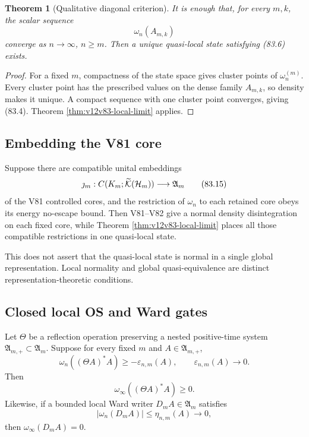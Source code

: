 \documentclass[11pt]{article}
\newtheorem{theorem}{Theorem}[section]
\theoremstyle{remark}
\begin{document}
\begin{theorem}[Qualitative diagonal criterion]
\label{thm:v12v83-qualitative}
It is enough that, for every \(m,k\), the scalar sequence
\begin{equation}
                              \omega_n(A_{m,k})               \tag{83.14}
\end{equation}
converge as \(n\to\infty\), \(n\geq m\).  Then a unique
quasi-local state satisfying (83.6) exists.
\end{theorem}

\begin{proof}
For a fixed \(m\), compactness of the state space gives cluster
points of \(\omega_n^{(m)}\).  Every cluster point has the prescribed
values on the dense family \(A_{m,k}\), so density makes it unique.
A compact sequence with one cluster point converges, giving (83.4).
Theorem \ref{thm:v12v83-local-limit} applies.
\end{proof}

\subsection{Embedding the V81 core}

Suppose there are compatible unital embeddings
\begin{equation}
 \jmath_m:
 C(K_m;\widetilde{\cal K}({\cal H}_m))
 \longrightarrow{\mathfrak A}_m                              \tag{83.15}
\end{equation}
of the V81 controlled cores, and the restriction of \(\omega_n\) to
each retained core obeys its energy no-escape bound.  Then V81--V82
give a normal density disintegration on each fixed core, while
Theorem \ref{thm:v12v83-local-limit} places all those compatible
restrictions in one quasi-local state.

This does not assert that the quasi-local state is normal in a
single global representation.  Local normality and global
quasi-equivalence are distinct representation-theoretic conditions.

\subsection{Closed local OS and Ward gates}

Let \(\Theta\) be a reflection operation preserving a nested
positive-time system
\({\mathfrak A}_{m,+}\subset{\mathfrak A}_m\).  Suppose for every
fixed \(m\) and \(A\in{\mathfrak A}_{m,+}\),
\begin{equation}
 \omega_n((\Theta A)^*A)\geq-\varepsilon_{n,m}(A),
 \qquad\varepsilon_{n,m}(A)\longrightarrow0.                \tag{83.16}
\end{equation}
Then
\begin{equation}
                         \omega_\infty((\Theta A)^*A)\geq0.  \tag{83.17}
\end{equation}
Likewise, if a bounded local Ward writer \(D_mA\in{\mathfrak A}_m\)
satisfies
\begin{equation}
                         |\omega_n(D_mA)|
 \leq\eta_{n,m}(A)\longrightarrow0,                         \tag{83.18}
\end{equation}
then \(\omega_\infty(D_mA)=0\).
\end{document}
